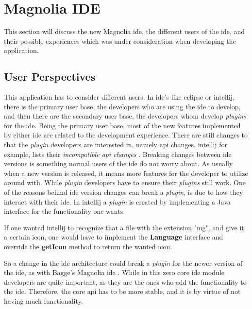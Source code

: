 \chapter{Magnolia IDE} \label{cha:ide}

This section will discuss the new Magnolia \gls{ide}, the different users of the
\gls{ide}, and their possible experiences which was under consideration when
developing the application.

\section{User Perspectives}

This application has to consider different users. In \gls{ide}'s like
\gls{eclipse} or \gls{intellij}, there is the primary user base, the developers
who are using the \gls{ide} to develop, and then there are the secondary user
base, the developers whom develop \textit{plugins} for the \gls{ide}. Being the
primary user base, most of the new features implemented by either \gls{ide} are
related to the development experience. There are still changes to that the
\textit{plugin} developers are interested in, namely \gls{api} changes.
\gls{intellij} for example, lists their \textit{incompatible \gls{api} changes}
\cite{intellijBrokenApi}. Breaking changes between \gls{ide} versions is
something normal users of the \gls{ide} do not worry about. As usually when a new
version is released, it means more features for the developer to utilize
around with. While \textit{plugin} developers have to ensure their
\textit{plugins} still work. One of the reasons behind \gls{ide} version changes
can break a \textit{plugin}, is due to how they interact with their \gls{ide}.
In \gls{intellij} a \textit{plugin} is created by implementing a Java interface
for the functionality one wants.

\begin{exmp}
  If one wanted \gls{intellij} to recognize that a file with the extension "mg",
  and give it a certain icon, one would have to implement the \textbf{Language}
  interface and override the \textbf{getIcon} method to return the wanted icon.
\end{exmp}

So a change in the \gls{ide} architecture could break a \textit{plugin} for the
newer version of the \gls{ide}, as with Bagge's Magnolia \gls{ide}
\cite{baggeIde}. While in this zero core \gls{ide} module developers are quite
important, as they are the ones who add the functionality to the \gls{ide}.
Therefore, the core \gls{api} has to be more stable, and it is by virtue of not
having much functionality.

